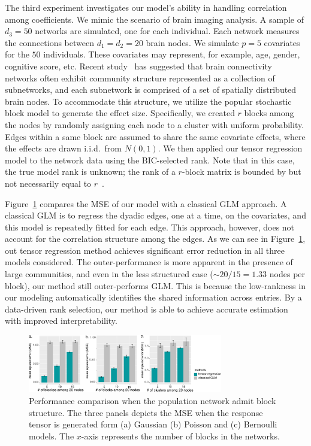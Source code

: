 \documentclass[twoside]{article}
\theoremstyle{plain}
\theoremstyle{definition}
\begin{document}
The third experiment investigates our model's ability in handling correlation among coefficients. We mimic the scenario of brain imaging analysis. A sample of $d_3=50$ networks are simulated, one for each individual. Each network measures the connections between $d_1=d_2=20$ brain nodes. We simulate $p=5$ covariates for the $50$ individuals. These covariates may represent, for example, age, gender, cognitive score, etc. Recent study~\cite{robinson2015dynamic} has suggested that brain connectivity networks often exhibit community structure represented as a collection of subnetworks, and each subnetwork is comprised of a set of spatially distributed brain nodes. To accommodate this structure, we utilize the popular stochastic block model to generate the effect size. Specifically, we created $r$ blocks among the nodes by randomly assigning each node to a cluster with uniform probability. Edges within a same block are assumed to share the same covariate effects, where the effects are drawn i.i.d.\ from $N(0,1)$. We then applied our tensor regression model to the network data using the BIC-selected rank. Note that in this case, the true model rank is unknown; the rank of a $r$-block matrix is bounded by but not necessarily equal to $r$~\cite{zeng2019multiway}. 

Figure~\ref{fig:glm} compares the MSE of our model with a classical GLM approach. A classical GLM is to regress the dyadic edges, one at a time, on the covariates, and this model is repeatedly fitted for each edge. This approach, however, does not account for the correlation structure among the edges. As we can see in Figure~\ref{fig:glm}, out tensor regression method achieves significant error reduction in all three models considered. The outer-performance is more apparent in the presence of large communities, and even in the less structured case ($\sim 20/15=1.33$ nodes per block), our method still outer-performs GLM. This is because the low-rankness in our modeling automatically identifies the shared information across entries. By a data-driven rank selection, our method is able to achieve accurate estimation with improved interpretability. 


\begin{figure}[t]
\includegraphics[width=8.5cm]{..//../code/binary_tucker/team/figure/comparison.pdf}
\caption{Performance comparison when the population network admit block structure. The three panels depicts the MSE when the response tensor is generated form (a) Gaussian (b) Poisson and (c) Bernoulli models. The $x$-axis represents the number of blocks in the networks. }\label{fig:glm}
\end{figure}
\end{document}
